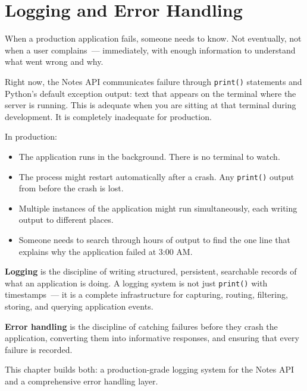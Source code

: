 \setcounter{chapter}{15}
\chapter{Logging and Error Handling}\label{ch:16-logging-error-handling}

\chapterrule

When a production application fails, someone needs to know. Not eventually, not when a user complains~--- immediately, with enough information to understand what went wrong and why.

Right now, the Notes API communicates failure through \texttt{print()} statements and Python's default exception output: text that appears on the terminal where the server is running. This is adequate when you are sitting at that terminal during development. It is completely inadequate for production.

In production:

\begin{itemize}
\tightlist
\item
  The application runs in the background. There is no terminal to watch.
\item
  The process might restart automatically after a crash. Any \texttt{print()} output from before the crash is lost.
\item
  Multiple instances of the application might run simultaneously, each writing output to different places.
\item
  Someone needs to search through hours of output to find the one line that explains why the application failed at 3:00 AM.
\end{itemize}

\noindent{}\textbf{Logging} is the discipline of writing structured, persistent, searchable records of what an application is doing. A logging system is not just \texttt{print()} with timestamps~--- it is a complete infrastructure for capturing, routing, filtering, storing, and querying application events.

\textbf{Error handling} is the discipline of catching failures before they crash the application, converting them into informative responses, and ensuring that every failure is recorded.

This chapter builds both: a production-grade logging system for the Notes API and a comprehensive error handling layer.

